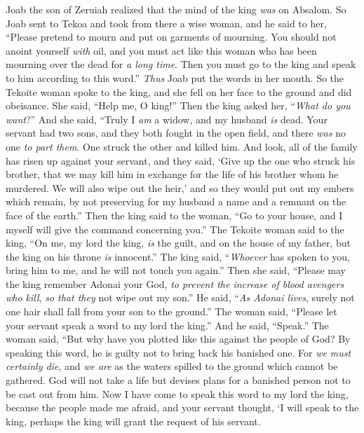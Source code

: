 \begin{biblechapter} %
 Joab the son of Zeruiah realized that the mind of the king \textit{was} on Absalom.
\verse So Joab sent to Tekoa and took from there a wise woman, and he said to her, “Please pretend to mourn and put on garments of mourning. You should not anoint yourself \textit{with} oil, and you must act like this woman who has been mourning over the dead for \textit{a long time}.
\verse Then you must go to the king and speak to him according to this word.” \textit{Thus} Joab put the words in her mouth.
\verse So the Tekoite woman spoke to the king, and she fell on her face to the ground and did obeisance. She said, “Help me, O king!”
\verse Then the king asked her, “\textit{What do you want}?” And she said, “Truly I \textit{am} a widow, and my husband \textit{is} dead.
\verse Your servant had two sons, and they both fought in the open field, and there \textit{was} no one \textit{to part them}. One struck the other and killed him.
\verse And look, all of the family has risen up against your servant, and they said, ‘Give up the one who struck his brother, that we may kill him in exchange for the life of his brother whom he murdered. We will also wipe out the heir,’ and so they would put out my embers which remain, by not preserving for my husband a name and a remnant on the face of the earth.”
\verse Then the king said to the woman, “Go to your house, and I myself will give the command concerning you.”
\verse The Tekoite woman said to the king, “On me, my lord the king, \textit{is} the guilt, and on the house of my father, but the king on his throne \textit{is} innocent.”
\verse The king said, “\textit{Whoever} has spoken to you, bring him to me, and he will not touch you again.”
\verse Then she said, “Please may the king remember Adonai your God, \textit{to prevent the increase of blood avengers who kill}, \textit{so that they} not wipe out my son.” He said, “\textit{As Adonai lives}, surely not one hair shall fall from your son to the ground.”
\verse The woman said, “Please let your servant speak a word to my lord the king.” And he said, “Speak.”
\verse The woman said, “But why have you plotted like this against the people of God? By speaking this word, he is guilty not to bring back his banished one.
\verse For \textit{we must certainly die}, and \textit{we are} as the waters spilled to the ground which cannot be gathered. God will not take a life but devises plans for a banished person not to be cast out from him.
\verse Now I have come to speak this word to my lord the king, because the people made me afraid, and your servant thought, ‘I will speak to the king, perhaps the king will grant the request of his servant.

\end{biblechapter}
